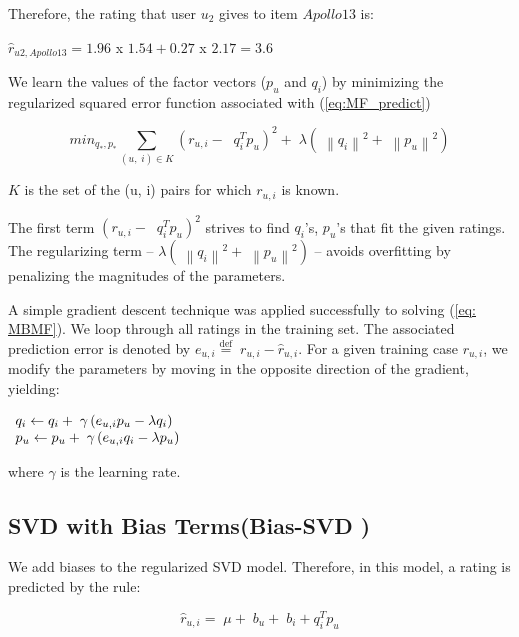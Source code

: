 \documentclass[oneside,13pt]{extreport}
\begin{document}
Therefore, the rating that user $u_2$ gives to item $Apollo 13$ is:

$\hat r_{u2,Apollo 13} = 1.96$ x $1.54 + 0.27$ x $2.17 = 3.6$

We learn the values of the factor vectors (${p_u}$ and ${q_i}$) by minimizing the regularized squared error function associated with (\ref{eq:MF_predict})

\begin{equation}
mi{n_{{q_*},{p_*}}}\mathop \sum \limits_{\left( {u,\;i} \right) \in K} {\left( {{r_{u,i}} - \;\;q_i^T{p_u}} \right)^2} + \;\lambda \left( {\;{{\left\| {{q_i}} \right\|}^2} + \;{{\left\| {{p_u}} \right\|}^2}} \right)
\label{eq: MBMF}
\end{equation}

$K$ is the set of the (u, i) pairs for which $r_{u,i}$ is known. 

The first term ${\left( {{r_{u,i}} - \;\;q_i^T{p_u}} \right)^2}$ strives to find $q_i$'s, $p_u$'s that fit the given ratings.
The regularizing term – $\lambda \left( {\;{{\left\| {{q_i}} \right\|}^2} + \;{{\left\| {{p_u}} \right\|}^2}}  \right)$ – avoids overfitting by penalizing the magnitudes of the parameters.

    A simple gradient descent technique was applied successfully to solving (\ref{eq: MBMF}).
We loop through all ratings in the training set. The associated prediction error is denoted by ${e_{u,i}} \stackrel{\text{def}}{=} \;{r_{u,i}} - \hat r_{u,i}$. For a given training case $r_{u,i}$, we modify the parameters by moving in the opposite direction of the gradient, yielding:

$\begin{array}{l}{q_i} \leftarrow {q_i} + {\rm{\;}}\gamma \left( {{e_{u,i}}{p_u} - {\lambda}{q_i}} \right)\\{p_u} \leftarrow {p_u} + {\rm{\;}}\gamma \left( {{e_{u,i}}{q_i} - {\lambda}{p_u}} \right)\end{array}
$

where $\gamma$ is the learning rate.
    


\subsection{SVD with Bias Terms(Bias-SVD )}
We add biases to the regularized SVD model. Therefore, in this model,
a rating is predicted by the rule:

\begin{equation}
{\hat r_{u,i}} = \;\mu  + \;{b_u} + \;{b_i} + q_i^T{p_u}
\label{eq: SVD}
\end{equation}
\end{document}
